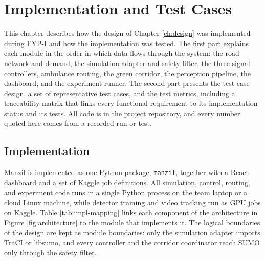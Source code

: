 \chapter{Implementation and Test Cases}
\label{ch:implementation}

This chapter describes how the design of Chapter \ref{ch:design} was implemented during FYP-I and how the implementation was tested. The first part explains each module in the order in which data flows through the system: the road network and demand, the simulation adapter and safety filter, the three signal controllers, ambulance routing, the green corridor, the perception pipeline, the dashboard, and the experiment runner. The second part presents the test-case design, a set of representative test cases, and the test metrics, including a traceability matrix that links every functional requirement to its implementation status and its tests. All code is in the project repository, and every number quoted here comes from a recorded run or test.

\section{Implementation}

Manzil is implemented as one Python package, \texttt{manzil}, together with a React dashboard and a set of Kaggle job definitions. All simulation, control, routing, and experiment code runs in a single Python process on the team laptop or a cloud Linux machine, while detector training and video tracking run as GPU jobs on Kaggle. Table \ref{tab:impl-mapping} links each component of the architecture in Figure \ref{fig:architecture} to the module that implements it. The logical boundaries of the design are kept as module boundaries: only the simulation adapter imports TraCI or libsumo, and every controller and the corridor coordinator reach SUMO only through the safety filter.

